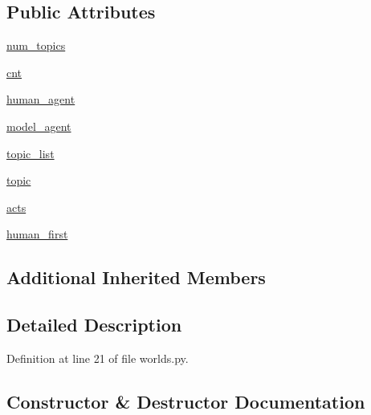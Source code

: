 \subsection*{Public Attributes}
\begin{DoxyCompactItemize}
\item 
\hyperlink{classparlai_1_1tasks_1_1wizard__of__wikipedia_1_1worlds_1_1InteractiveWorld_a32f2d277a7892c9e8c7c64c12a8f4ba7}{num\+\_\+topics}
\item 
\hyperlink{classparlai_1_1tasks_1_1wizard__of__wikipedia_1_1worlds_1_1InteractiveWorld_ac89fdf4af0e037452e4e965560b68eea}{cnt}
\item 
\hyperlink{classparlai_1_1tasks_1_1wizard__of__wikipedia_1_1worlds_1_1InteractiveWorld_a54ecd8d0f7c5dd064d0c2b511f9ac03b}{human\+\_\+agent}
\item 
\hyperlink{classparlai_1_1tasks_1_1wizard__of__wikipedia_1_1worlds_1_1InteractiveWorld_abc5413fa516f7fb0cc4e0c52d918d572}{model\+\_\+agent}
\item 
\hyperlink{classparlai_1_1tasks_1_1wizard__of__wikipedia_1_1worlds_1_1InteractiveWorld_ad323b2b928a31a0b048059a1569ae8f2}{topic\+\_\+list}
\item 
\hyperlink{classparlai_1_1tasks_1_1wizard__of__wikipedia_1_1worlds_1_1InteractiveWorld_ad248b70f56a67f58e7799eb126315169}{topic}
\item 
\hyperlink{classparlai_1_1tasks_1_1wizard__of__wikipedia_1_1worlds_1_1InteractiveWorld_af926c611144cdc54b7f1c631286b388b}{acts}
\item 
\hyperlink{classparlai_1_1tasks_1_1wizard__of__wikipedia_1_1worlds_1_1InteractiveWorld_a8a0ba61c930502f811dd033a6e52c327}{human\+\_\+first}
\end{DoxyCompactItemize}
\subsection*{Additional Inherited Members}


\subsection{Detailed Description}


Definition at line 21 of file worlds.\+py.



\subsection{Constructor \& Destructor Documentation}
\mbox{\label{classparlai_1_1tasks_1_1wizard__of__wikipedia_1_1worlds_1_1InteractiveWorld_a17330f1fd256bd53eafea1c7e119d77d}} 

